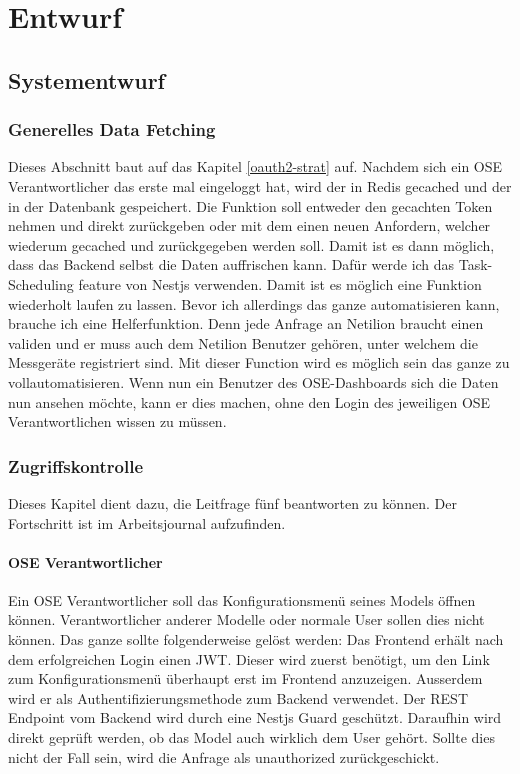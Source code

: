 
\chapter{Entwurf}
\section{Systementwurf}
\subsection{Generelles Data Fetching} \label{data-fetching}
Dieses Abschnitt baut auf das Kapitel \ref{oauth2-strat} auf.
\newline
Nachdem sich ein OSE Verantwortlicher das erste mal eingeloggt hat, wird der  in Redis gecached und der  in der Datenbank gespeichert. Die Funktion soll entweder den gecachten Token nehmen und direkt zurückgeben oder mit dem  einen neuen Anfordern, welcher wiederum gecached und zurückgegeben werden soll. Damit ist es dann möglich, dass das Backend selbst die Daten auffrischen kann. Dafür werde ich das Task-Scheduling\cite{a2021_documentation} feature von Nestjs verwenden. Damit ist es möglich eine Funktion wiederholt laufen zu lassen.
\newline
Bevor ich allerdings das ganze automatisieren kann, brauche ich eine Helferfunktion. Denn jede Anfrage an Netilion braucht einen validen  und er muss auch dem Netilion Benutzer gehören, unter welchem die Messgeräte registriert sind. Mit dieser Function wird es möglich sein das ganze zu vollautomatisieren. Wenn nun ein Benutzer des OSE-Dashboards sich die Daten nun ansehen möchte, kann er dies machen, ohne den Login des jeweiligen OSE Verantwortlichen wissen zu müssen.
\pagebreak
\subsection{Zugriffskontrolle}
Dieses Kapitel dient dazu, die Leitfrage fünf beantworten zu können. Der Fortschritt ist im Arbeitsjournal aufzufinden.
\subsubsection{OSE Verantwortlicher}
Ein OSE Verantwortlicher soll das Konfigurationsmenü seines Models öffnen können. Verantwortlicher anderer Modelle oder normale User sollen dies nicht können.
Das ganze sollte folgenderweise gelöst werden:
\newline
Das Frontend erhält nach dem erfolgreichen Login einen JWT. Dieser wird zuerst benötigt, um den Link zum Konfigurationsmenü überhaupt erst im Frontend anzuzeigen. Ausserdem wird er als Authentifizierungsmethode zum Backend verwendet. Der REST Endpoint vom Backend wird durch eine Nestjs Guard\cite{nest_guards} geschützt. Daraufhin wird direkt geprüft werden, ob das Model auch wirklich dem User gehört. Sollte dies nicht der Fall sein, wird die Anfrage als unauthorized zurückgeschickt.
